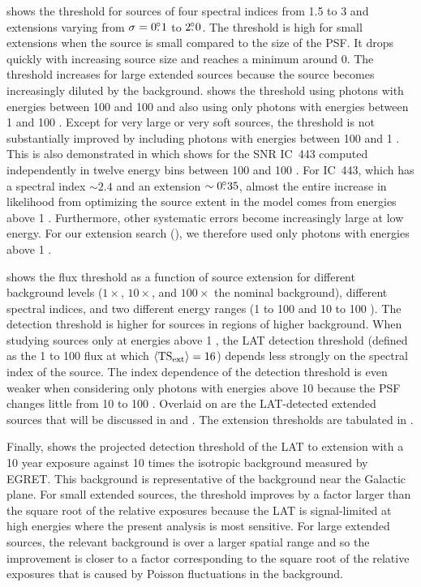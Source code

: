  shows the threshold for sources of four
spectral indices from 1.5 to 3 and extensions varying from $\sigma=0\mbox{$.\!\!^\circ$}1$
to $2\mbox{$.\!\!^\circ$}0$.  
The threshold is high for small extensions when the
source is 
small compared to the size of the PSF. 
It drops quickly with increasing source size and reaches
a minimum around 0. 
The threshold increases
for large extended sources because the source becomes
increasingly diluted by the background.
 shows
the threshold using photons with energies between 100 \mev and 100 \gev
and also using only photons with energies between 1 \gev and 100 \gev.
Except for very large or very soft
sources, the threshold is
not substantially improved by including photons with energies between 100 \mev and
1 \gev.  This is also demonstrated in 
which shows \tsext for the SNR IC~443 computed independently in twelve
energy bins between 100 \mev and 100 \gev. For IC~443, which has a
spectral index $\sim2.4$ and an extension $\sim0\mbox{$.\!\!^\circ$}35$, 
almost the entire 
increase in likelihood from optimizing the source extent in the model
comes
from energies above 1 \gev.  Furthermore, other systematic errors
become increasingly large at low energy. For our extension search
(),
we therefore used only photons with energies above 1 \gev.

 shows the flux threshold as a function of
source extension for different background levels ($1\times$, $10\times$,
and $100\times$ the nominal background), different spectral indices,
and two different energy ranges (1 \gev to 100 \gev and 10 \gev to
100 \gev).  The detection threshold is higher for sources in regions of
higher background.  When studying sources only at energies above 1 \gev,
the LAT detection threshold (defined as the 1 \gev to 100 \gev flux at
which $\langle\mathrm{TS}_\mathrm{ext}\rangle=16$) depends less strongly on the 
spectral index of the source. 
The index dependence of the detection threshold is
even weaker when considering only photons with energies above 10 \gev
because the PSF changes little from 10 \gev to 100 \gev.
Overlaid on  are the LAT-detected extended
sources that will be discussed in  and
.  The extension thresholds are tabulated in
.

Finally,  shows the projected
detection threshold of the LAT to extension with a 10 year
exposure against 10 times
the isotropic background measured by EGRET. This background is
representative of the background near the Galactic plane.  For small
extended sources, the threshold improves by a factor larger
than the square root of the relative exposures because the LAT is signal-limited
at high energies where the present analysis is most sensitive. For large
extended sources, the relevant background is over a larger spatial range
and so the improvement is closer to a factor corresponding
to the square root of the relative exposures that is caused by Poisson fluctuations in the background.


